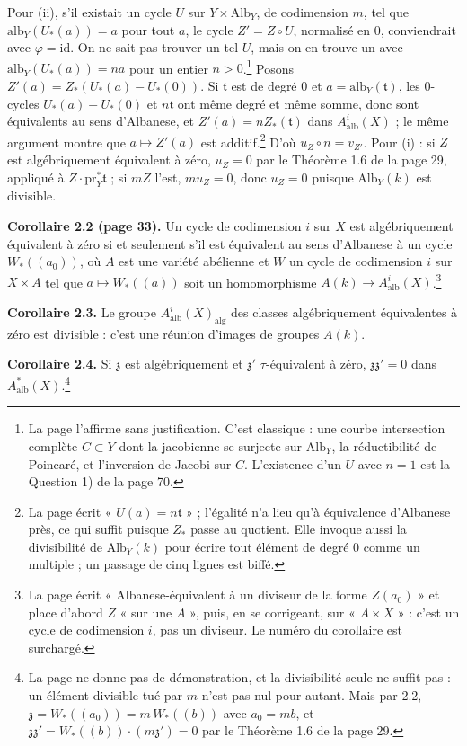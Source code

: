 \documentclass[11pt,a4paper]{article}
\begin{document}
Pour (ii), s'il existait un cycle $U$ sur $Y \times \mathrm{Alb}_{Y}$, de
codimension $m$, tel que $\mathrm{alb}_{Y}(U_{*}(a)) = a$ pour tout $a$, le
cycle $Z' = Z \circ U$, normalisé en $0$, conviendrait avec $\varphi =
\mathrm{id}$. On ne sait pas trouver un tel $U$, mais on en trouve un avec
$\mathrm{alb}_{Y}(U_{*}(a)) = na$ pour un entier $n > 0$.\footnote{La page
l'affirme sans justification. C'est classique : une courbe intersection
complète $C \subset Y$ dont la jacobienne se surjecte sur $\mathrm{Alb}_{Y}$,
la réductibilité de Poincaré, et l'inversion de Jacobi sur $C$. L'existence d'un
$U$ avec $n = 1$ est la Question 1) de la page 70.} Posons $Z'(a) =
Z_{*}(U_{*}(a) - U_{*}(0))$. Si $\mathfrak{t}$ est de degré $0$ et $a =
\mathrm{alb}_{Y}(\mathfrak{t})$, les $0$-cycles $U_{*}(a) - U_{*}(0)$ et
$n\mathfrak{t}$ ont même degré et même somme, donc sont équivalents au sens
d'Albanese, et $Z'(a) = n Z_{*}(\mathfrak{t})$ dans
$A^{i}_{\mathrm{alb}}(X)$ ; le même argument montre que $a \mapsto Z'(a)$ est
additif.\footnote{La page écrit « $U(a) = n\mathfrak{t}$ » ; l'égalité n'a lieu
qu'à équivalence d'Albanese près, ce qui suffit puisque $Z_{*}$ passe au
quotient. Elle invoque aussi la divisibilité de $\mathrm{Alb}_{Y}(k)$ pour
écrire tout élément de degré $0$ comme un multiple ; un passage de cinq lignes
est biffé.} D'où $u_{Z} \circ n = v_{Z'}$. Pour (i) : si $Z$ est
algébriquement équivalent à zéro, $u_{Z} = 0$ par le Théorème 1.6 de la page
29, appliqué à $Z \cdot \mathrm{pr}_{Y}^{*}\mathfrak{t}$ ; si $mZ$ l'est, $m
u_{Z} = 0$, donc $u_{Z} = 0$ puisque $\mathrm{Alb}_{Y}(k)$ est divisible.

\textbf{Corollaire 2.2 (page 33).} Un cycle de codimension $i$ sur $X$ est
algébriquement équivalent à zéro si et seulement s'il est équivalent au sens
d'Albanese à un cycle $W_{*}((a_{0}))$, où $A$ est une variété abélienne et $W$
un cycle de codimension $i$ sur $X \times A$ tel que $a \mapsto W_{*}((a))$ soit
un homomorphisme $A(k) \to A^{i}_{\mathrm{alb}}(X)$.\footnote{La page écrit
« Albanese-équivalent à un diviseur de la forme $Z(a_{0})$ » et place d'abord
$Z$ « sur une $A$ », puis, en se corrigeant, sur « $A \times X$ » : c'est un
cycle de codimension $i$, pas un diviseur. Le numéro du corollaire est
surchargé.}

\textbf{Corollaire 2.3.} Le groupe $A^{i}_{\mathrm{alb}}(X)_{\mathrm{alg}}$ des
classes algébriquement équivalentes à zéro est divisible : c'est une réunion
d'images de groupes $A(k)$.

\textbf{Corollaire 2.4.} Si $\mathfrak{z}$ est algébriquement et
$\mathfrak{z}'$ $\tau$-équivalent à zéro, $\mathfrak{z}\mathfrak{z}' = 0$ dans
$A^{*}_{\mathrm{alb}}(X)$.\footnote{La page ne donne pas de démonstration, et la
divisibilité seule ne suffit pas : un élément divisible tué par $m$ n'est pas
nul pour autant. Mais par 2.2, $\mathfrak{z} = W_{*}((a_{0})) = m\,W_{*}((b))$
avec $a_{0} = mb$, et $\mathfrak{z}\mathfrak{z}' = W_{*}((b)) \cdot
(m\mathfrak{z}') = 0$ par le Théorème 1.6 de la page 29.}
\end{document}
